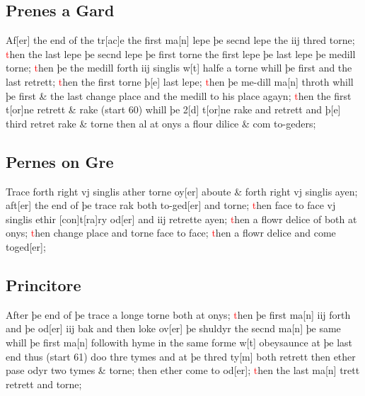 \documentclass[12pt,letter]{article} %
\newcommand{\red}[1]{\textcolor{red}{#1}}
\newcommand{\srcpg}[1]{(start #1)}
\begin{document}
\subsection{Prenes a Gard}
Af{[}er{]} the end of the tr{[}ac{]}e the first ma{[}n{]} lepe þe secnd
lepe the iij thred torne; \red{t}hen the last lepe þe secnd lepe þe first
torne the first lepe þe last lepe þe medill torne; \red{t}hen þe the medill
forth iij singlis w{[}t{]} halfe a torne whill þe first and the last
retrett; \red{t}hen the first torne þ{[}e{]} last lepe; \red{t}hen þe me-dill
ma{[}n{]} throth whill þe first \& the last change place and the medill
to his place agayn; \red{t}hen the first t{[}or{]}ne retrett \& rake \srcpg{60}
whill þe 2{[}d{]} t{[}or{]}ne rake and retrett and þ{[}e{]} third retret
rake \& torne then al at onys a flour dilice \& com to-geders;

\subsection{Pernes on Gre}
Trace forth right vj singlis ather torne oy{[}er{]} aboute \& forth right
vj singlis ayen; aft{[}er{]} the end of þe trace rak both to-ged{[}er{]}
and torne; \red{t}hen face to face vj singlis  ethir {[}con{]}t{[}ra{]}ry
od{[}er{]} and iij retrette ayen; \red{t}hen a flowr delice of both at onys;
\red{t}hen change place and torne face to face; \red{t}hen a flowr delice and come
toged{[}er{]};

\subsection{Princitore}
After þe end of þe trace a longe torne both at onys; \red{t}hen þe first
ma{[}n{]} iij forth and þe od{[}er{]} iij bak and then loke ov{[}er{]}
þe shuldyr the secnd ma{[}n{]} þe same whill þe first ma{[}n{]}
followith hyme in the same forme w{[}t{]} obeysaunce at þe last end thus
\srcpg{61} doo thre tymes and at þe thred ty{[}m{]} both retrett then
ether pase odyr two tymes \& torne; then ether come to od{[}er{]}; \red{t}hen
the last ma{[}n{]} trett retrett and torne;
\end{document}
